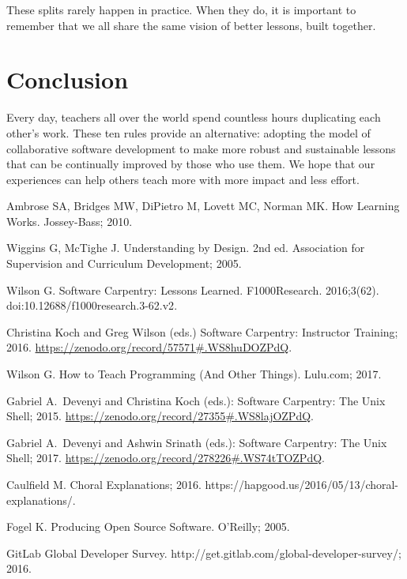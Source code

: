 \documentclass[10pt,letterpaper]{article}
\begin{document}
These splits rarely happen in practice.
When they do,
it is important to remember that we all share the same vision of better lessons, built together.

\section*{Conclusion}

Every day,
teachers all over the world spend countless hours duplicating each other's work.
These ten rules provide an alternative:
adopting the model of collaborative software development
to make more robust and sustainable lessons
that can be continually improved by those who use them.
We hope that our experiences can help others teach more
with more impact and less effort.

\nolinenumbers

%
%

\begin{thebibliography}{1}

Ambrose SA, Bridges MW, DiPietro M, Lovett MC, Norman MK.
\newblock How Learning Works.
\newblock Jossey-Bass; 2010.

Wiggins G, McTighe J.
\newblock Understanding by Design.
\newblock 2nd ed. Association for Supervision and Curriculum Development; 2005.

Wilson G.
\newblock Software Carpentry: Lessons Learned.
\newblock F1000Research. 2016;3(62).
\newblock doi:{10.12688/f1000research.3-62.v2}.

Christina Koch and Greg Wilson (eds.)
\newblock Software Carpentry: Instructor Training; 2016.
\newblock \url{https://zenodo.org/record/57571#.WS8huDOZPdQ}.

Wilson G.
\newblock How to Teach Programming (And Other Things).
\newblock Lulu.com; 2017.

Gabriel A.~Devenyi and Christina Koch (eds.):
Software Carpentry: The Unix Shell; 2015.
\newblock \url{https://zenodo.org/record/27355#.WS8lajOZPdQ}.

Gabriel A.~Devenyi and Ashwin Srinath (eds.):
Software Carpentry: The Unix Shell; 2017.
\newblock \url{https://zenodo.org/record/278226#.WS74tTOZPdQ}.

Caulfield M. Choral Explanations; 2016.
\newblock https://hapgood.us/2016/05/13/choral-explanations/.

Fogel K.
\newblock Producing Open Source Software.
\newblock O'Reilly; 2005.

GitLab
\newblock Global Developer Survey.
\newblock http://get.gitlab.com/global-developer-survey/; 2016.

\end{thebibliography}
\end{document}
